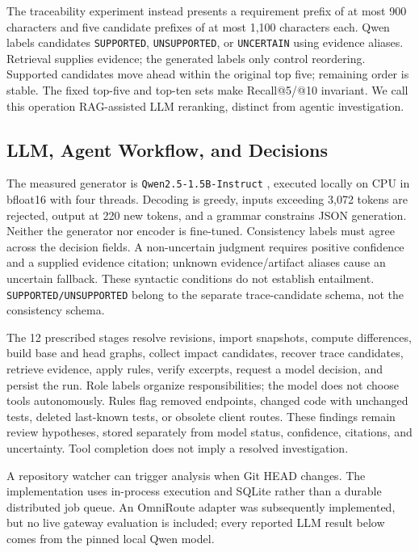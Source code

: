 \documentclass[conference,letterpaper,10pt]{IEEEtran}
\begin{document}
The traceability experiment instead presents a requirement prefix of at most 900 characters and five candidate prefixes of at most 1,100 characters each. Qwen labels candidates \texttt{SUPPORTED}, \texttt{UNSUPPORTED}, or \texttt{UNCERTAIN} using evidence aliases. Retrieval supplies evidence; the generated labels only control reordering. Supported candidates move ahead within the original top five; remaining order is stable. The fixed top-five and top-ten sets make Recall@5/@10 invariant. We call this operation RAG-assisted LLM reranking, distinct from agentic investigation.

\subsection{LLM, Agent Workflow, and Decisions}
The measured generator is \texttt{Qwen2.5-1.5B-Instruct} \cite{qwen}, executed locally on CPU in bfloat16 with four threads. Decoding is greedy, inputs exceeding 3,072 tokens are rejected, output at 220 new tokens, and a grammar constrains JSON generation. Neither the generator nor encoder is fine-tuned. Consistency labels must agree across the decision fields. A non-uncertain judgment requires positive confidence and a supplied evidence citation; unknown evidence/artifact aliases cause an uncertain fallback. These syntactic conditions do not establish entailment. \texttt{SUPPORTED/UNSUPPORTED} belong to the separate trace-candidate schema, not the consistency schema.

The 12 prescribed stages resolve revisions, import snapshots, compute differences, build base and head graphs, collect impact candidates, recover trace candidates, retrieve evidence, apply rules, verify excerpts, request a model decision, and persist the run. Role labels organize responsibilities; the model does not choose tools autonomously. Rules flag removed endpoints, changed code with unchanged tests, deleted last-known tests, or obsolete client routes. These findings remain review hypotheses, stored separately from model status, confidence, citations, and uncertainty. Tool completion does not imply a resolved investigation.

A repository watcher can trigger analysis when Git HEAD changes. The implementation uses in-process execution and SQLite rather than a durable distributed job queue. An OmniRoute adapter was subsequently implemented, but no live gateway evaluation is included; every reported LLM result below comes from the pinned local Qwen model.
\end{document}

